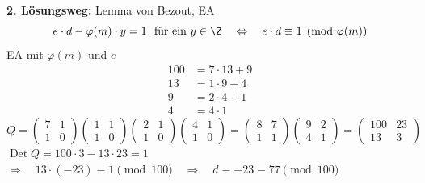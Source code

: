 \begin{loesung}
\textbf{2. Lösungsweg:} Lemma von Bezout, EA
\[
e \cdot d - \varphi(m) \cdot y = 1 \ \text{ für ein } y \in \Z \quad\Leftrightarrow\quad e \cdot d \equiv 1 \pmod{\varphi(m)}
\]
EA mit $\varphi(m)$ und $e$
\begin{align*}
100 &= 7 \cdot 13 + 9\\
13 &= 1 \cdot 9 + 4\\
9 &= 2 \cdot 4 + 1\\
4 &= 4 \cdot 1
\end{align*}
\[
Q = \begin{pmatrix} 7 & 1\\ 1 & 0\end{pmatrix}
\begin{pmatrix} 1 & 1\\ 1 & 0\end{pmatrix}
\begin{pmatrix} 2 & 1\\ 1 & 0\end{pmatrix}
\begin{pmatrix} 4 & 1\\ 1 & 0\end{pmatrix}
= \begin{pmatrix} 8 & 7\\ 1 & 1\end{pmatrix}
\begin{pmatrix} 9 & 2\\ 4 & 1\end{pmatrix}
= \begin{pmatrix} 100 & 23\\ 13 & 3\end{pmatrix}
\]
$\operatorname{Det} Q = 100 \cdot 3 - 13 \cdot 23 = 1$\\
$\Rightarrow\quad 13 \cdot (-23) \equiv 1 \pmod{100} \quad\Rightarrow\quad d \equiv -23 \equiv 77 \pmod{100}$
\end{loesung}
